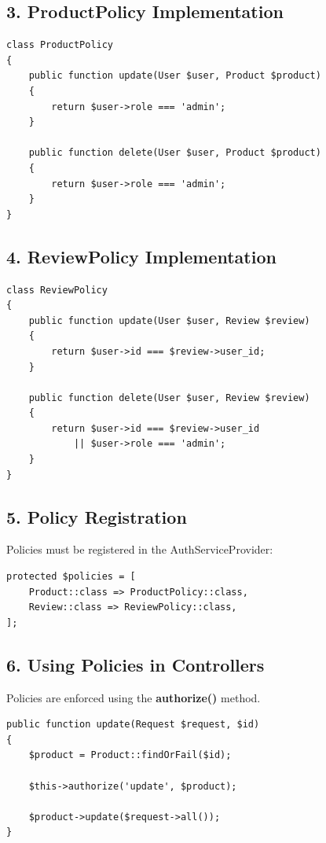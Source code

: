 \documentclass[12pt,a4paper]{article}
\begin{document}
\subsection{3. ProductPolicy Implementation}

\begin{verbatim}
class ProductPolicy
{
    public function update(User $user, Product $product)
    {
        return $user->role === 'admin';
    }

    public function delete(User $user, Product $product)
    {
        return $user->role === 'admin';
    }
}
\end{verbatim}

\subsection{4. ReviewPolicy Implementation}

\begin{verbatim}
class ReviewPolicy
{
    public function update(User $user, Review $review)
    {
        return $user->id === $review->user_id;
    }

    public function delete(User $user, Review $review)
    {
        return $user->id === $review->user_id
            || $user->role === 'admin';
    }
}
\end{verbatim}

\subsection{5. Policy Registration}

Policies must be registered in the AuthServiceProvider:

\begin{verbatim}
protected $policies = [
    Product::class => ProductPolicy::class,
    Review::class => ReviewPolicy::class,
];
\end{verbatim}

\subsection{6. Using Policies in Controllers}

Policies are enforced using the \textbf{authorize()} method.

\begin{verbatim}
public function update(Request $request, $id)
{
    $product = Product::findOrFail($id);

    $this->authorize('update', $product);

    $product->update($request->all());
}
\end{verbatim}
\end{document}
